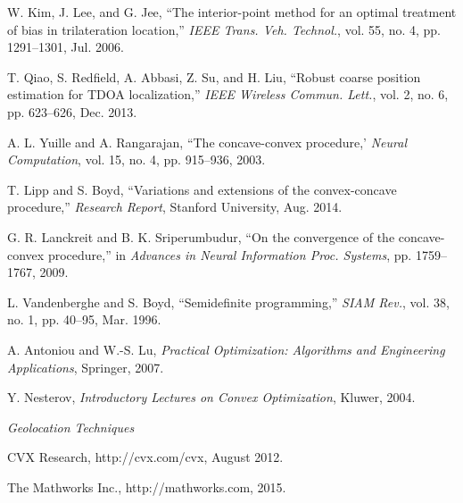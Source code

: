 \begin{thebibliography}{99}
W. Kim, J. Lee, and G. Jee, ``The interior-point method for an optimal
treatment of bias in trilateration location,'' {\em IEEE Trans. Veh. Technol.}, vol. 55, no. 4, pp. 1291–1301, Jul. 2006.

T. Qiao, S. Redfield, A. Abbasi, Z. Su, and H. Liu, ``Robust coarse position estimation for TDOA localization,'' {\em IEEE Wireless Commun. Lett.}, vol. 2, no. 6, pp. 623–626, Dec. 2013.

A. L. Yuille and A. Rangarajan, ``The concave-convex procedure,' {\em Neural Computation}, vol. 15, no. 4, pp. 915--936, 2003.

T. Lipp and S. Boyd, ``Variations and extensions of the convex-concave procedure,'' {\em Research Report}, Stanford University, Aug. 2014.

G. R. Lanckreit and B. K. Sriperumbudur, ``On the convergence of the concave-convex procedure,'' in  {\em Advances in Neural Information Proc. Systems}, pp. 1759--1767, 2009.

L. Vandenberghe and S. Boyd, ``Semidefinite programming,'' {\em SIAM Rev.}, vol. 38, no. 1, pp. 40--95, Mar. 1996.

A. Antoniou and W.-S. Lu, {\em Practical Optimization: Algorithms and Engineering Applications}, Springer, 2007.

Y. Nesterov, {\em Introductory Lectures on Convex Optimization}, Kluwer, 2004.

{\em Geolocation Techniques}

CVX Research, http://cvx.com/cvx, August 2012.

The Mathworks Inc., http://mathworks.com, 2015.

\end{thebibliography}
